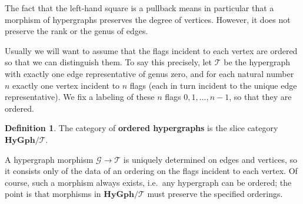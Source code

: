 \documentclass{article}
\theoremstyle{definition}
\newtheorem{defn}[thm]{Definition}
\theoremstyle{remark}
\def\G{\mathcal{G}}
\def\hy{\mathbf{HyGph}}
\def\thy{\mathcal{T}}
\begin{document}
The fact that the left-hand square is a pullback means in particular that a morphism of hypergraphs preserves the degree of vertices.
However, it does not preserve the rank or the genus of edges.

Usually we will want to assume that the flags incident to each vertex are ordered so that we can distinguish them.
To say this precisely, let $\thy$ be the hypergraph with exactly one edge representative of genus zero, and for each natural number $n$ exactly one vertex incident to $n$ flags (each in turn incident to the unique edge representative).
We fix a labeling of these $n$ flags $0,1,\dots,n-1$, so that they are ordered.

\begin{defn}
  The category of \textbf{ordered hypergraphs} is the slice category $\hy/\thy$.
\end{defn}

A hypergraph morphism $\G\to\thy$ is uniquely determined on edges and vertices, so it consists only of the data of an ordering on the flags incident to each vertex.
Of course, such a morphism always exists, i.e.\ any hypergraph can be ordered; the point is that morphisms in $\hy/\thy$ must preserve the specified orderings.
\end{document}

